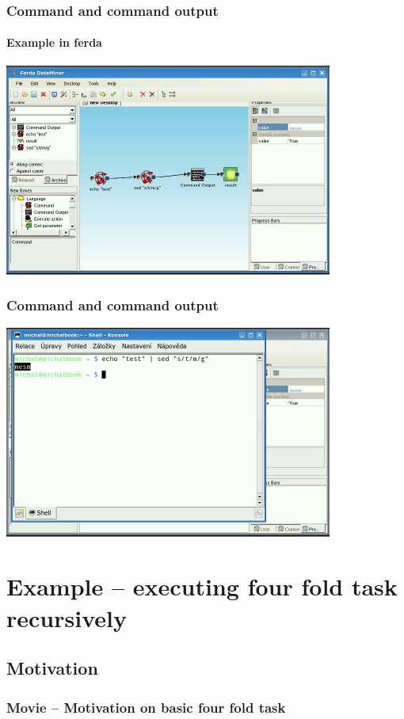 \documentclass{beamer}
\begin{document}
\begin{frame}
	\frametitle{Command and command output}
	\framesubtitle{Example in ferda}
	\includegraphics[width=10.8cm]{command2.png}
\end{frame}

\begin{frame}
	\frametitle{Command and command output}
	\subtitle{The same in console}
	\includegraphics[width=10.8cm]{command3.png}
\end{frame}

\section{Example -- executing four fold task recursively}
\subsection{Motivation}
\begin{frame}
	\frametitle{Movie -- Motivation on basic four fold task}
\end{frame}
\end{document}
